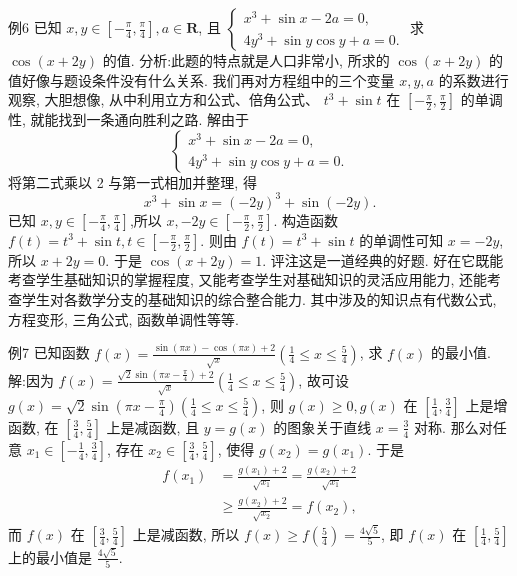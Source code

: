 例6 已知 $x, y \in\left[-\frac{\pi}{4}, \frac{\pi}{4}\right], a \in \mathbf{R}$, 且 $\left\{\begin{array}{l}x^3+\sin x-2 a=0, \\ 4 y^3+\sin y \cos y+a=0 .\end{array}\right.$ 求 $\cos (x+2 y)$ 的值.
分析:此题的特点就是人口非常小, 所求的 $\cos (x+2 y)$ 的值好像与题设条件没有什么关系.
我们再对方程组中的三个变量 $x, y, a$ 的系数进行观察,
大胆想像, 从中利用立方和公式、倍角公式、 $t^3+\sin t$ 在 $\left[-\frac{\pi}{2}, \frac{\pi}{2}\right]$ 的单调性, 就能找到一条通向胜利之路.
解由于
$$
\left\{\begin{array}{l}
x^3+\sin x-2 a=0, \\
4 y^3+\sin y \cos y+a=0 .
\end{array}\right.
$$
将第二式乘以 2 与第一式相加并整理, 得
$$
x^3+\sin x=(-2 y)^3+\sin (-2 y) .
$$
已知 $x, y \in\left[-\frac{\pi}{4}, \frac{\pi}{4}\right]$,所以 $x,-2 y \in\left[-\frac{\pi}{2}, \frac{\pi}{2}\right]$.
构造函数 $f(t)=t^3+\sin t, t \in\left[-\frac{\pi}{2}, \frac{\pi}{2}\right]$. 则由 $f(t)=t^3+\sin t$ 的单调性可知 $x=-2 y$, 所以 $x+2 y=0$.
于是 $\cos (x+2 y)=1$.
评注这是一道经典的好题.
好在它既能考查学生基础知识的掌握程度, 又能考查学生对基础知识的灵活应用能力, 还能考查学生对各数学分支的基础知识的综合整合能力.
其中涉及的知识点有代数公式, 方程变形, 三角公式, 函数单调性等等.



例7 已知函数 $f(x)=\frac{\sin (\pi x)-\cos (\pi x)+2}{\sqrt{x}}\left(\frac{1}{4} \leqslant x \leqslant \frac{5}{4}\right)$, 求 $f(x)$ 的最小值.
解:因为 $f(x)=\frac{\sqrt{2} \sin \left(\pi x-\frac{\pi}{4}\right)+2}{\sqrt{x}}\left(\frac{1}{4} \leqslant x \leqslant \frac{5}{4}\right)$, 故可设 $g(x)= \sqrt{2} \sin \left(\pi x-\frac{\pi}{4}\right)\left(\frac{1}{4} \leqslant x \leqslant \frac{5}{4}\right)$, 则 $g(x) \geqslant 0, g(x)$ 在 $\left[\frac{1}{4}, \frac{3}{4}\right]$ 上是增函数, 在 $\left[\frac{3}{4}, \frac{5}{4}\right]$ 上是减函数, 且 $y=g(x)$ 的图象关于直线 $x=\frac{3}{4}$ 对称.
那么对任意 $x_1 \in\left[-\frac{1}{4}, \frac{3}{4}\right]$, 存在 $x_2 \in\left[\frac{3}{4}, \frac{5}{4}\right]$, 使得 $g\left(x_2\right)=g\left(x_1\right)$. 于是
$$
\begin{aligned}
f\left(x_1\right) & =\frac{g\left(x_1\right)+2}{\sqrt{x_1}}=\frac{g\left(x_2\right)+2}{\sqrt{x_1}} \\
& \geqslant \frac{g\left(x_2\right)+2}{\sqrt{x_2}}=f\left(x_2\right),
\end{aligned}
$$
而 $f(x)$ 在 $\left[\frac{3}{4}, \frac{5}{4}\right]$ 上是减函数, 所以 $f(x) \geqslant f\left(\frac{5}{4}\right)=\frac{4 \sqrt{5}}{5}$, 即 $f(x)$ 在
$\left[\frac{1}{4}, \frac{5}{4}\right]$ 上的最小值是 $\frac{4 \sqrt{5}}{5}$.



